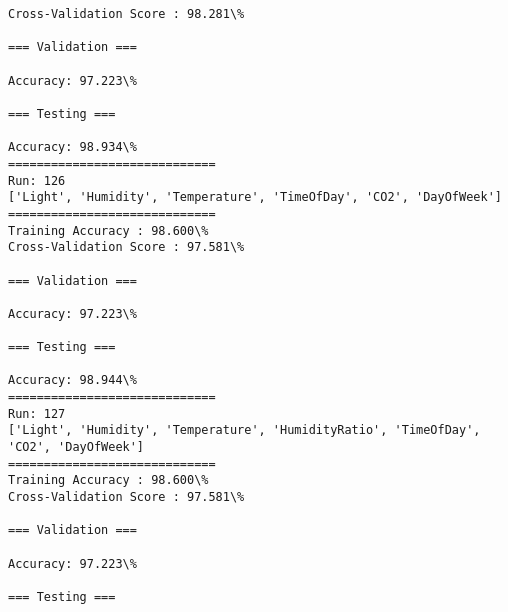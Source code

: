 \documentclass[11pt]{article}
\begin{document}
    \begin{Verbatim}[commandchars=\\\{\}]
Cross-Validation Score : 98.281\%

=== Validation ===

Accuracy: 97.223\%

=== Testing ===

Accuracy: 98.934\%
=============================
Run: 126
['Light', 'Humidity', 'Temperature', 'TimeOfDay', 'CO2', 'DayOfWeek']
=============================
Training Accuracy : 98.600\%
Cross-Validation Score : 97.581\%

=== Validation ===

Accuracy: 97.223\%

=== Testing ===

Accuracy: 98.944\%
=============================
Run: 127
['Light', 'Humidity', 'Temperature', 'HumidityRatio', 'TimeOfDay', 'CO2', 'DayOfWeek']
=============================
Training Accuracy : 98.600\%
Cross-Validation Score : 97.581\%

=== Validation ===

Accuracy: 97.223\%

=== Testing ===


\end{Verbatim}
\end{document}
